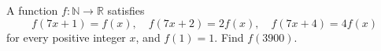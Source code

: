 A function $f:\mathbb N\to\mathbb R$ satisfies
\[
f(7x+1)=f(x),\quad f(7x+2)=2f(x),\quad f(7x+4)=4f(x)
\]
for every positive integer $x$, and $f(1)=1$. Find $f(3900)$.
